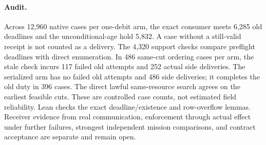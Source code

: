 \documentclass{article}
\begin{document}
\paragraph{Audit.}
Across 12,960 native cases per one-debit arm, the exact
consumer meets 6,285 old deadlines and the unconditional-age
hold 5,832. A case without a still-valid receipt is not
counted as a delivery. The 4,320 support checks compare
preflight deadlines with direct enumeration. In 486 same-cut
ordering cases per arm, the stale check incurs 117 failed old
attempts and 252 actual side deliveries. The serialized arm
has no failed old attempts and 486 side deliveries; it
completes the old duty in 396 cases. The direct lawful
same-resource search agrees on the earliest feasible cuts.
These are controlled case counts, not estimated field
reliability. Lean checks the exact deadline/existence and
row-overflow lemmas. Receiver evidence from real communication,
enforcement through actual effect under further failures,
strongest independent mission comparisons, and contract
acceptance are separate and remain open.
\end{document}

